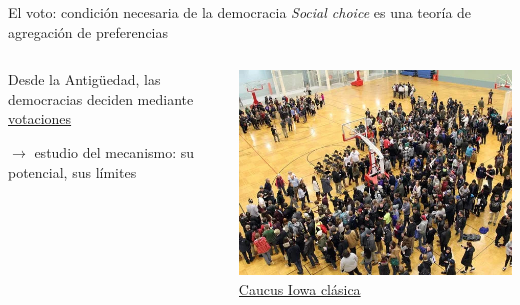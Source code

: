 \documentclass[bigger]{beamer}
\begin{document}
\begin{frame}[label={sec:org0f77309}]{El voto: condición necesaria de la democracia}
\emph{Social choice} es una teoría de agregación de preferencias

\pause \bigskip

\begin{columns}
\begin{column}{0.45\columnwidth}
Desde la Antigüedad, las democracias deciden mediante \uline{votaciones}

\bigskip

\(\rightarrow\) estudio del \alert{mecanismo}: su potencial, sus límites
\end{column}

\begin{column}{0.55\columnwidth}
\centering
\includegraphics[width=.85\textwidth]{./pics/iowa-2016-caucus.jpg} \\[0pt]
\href{https://www.youtube.com/watch?v=tCvMtkEVqdA}{\footnotesize{\ExternalLink Caucus Iowa clásica}}
\end{column}
\end{columns}
\end{frame}
\end{document}
